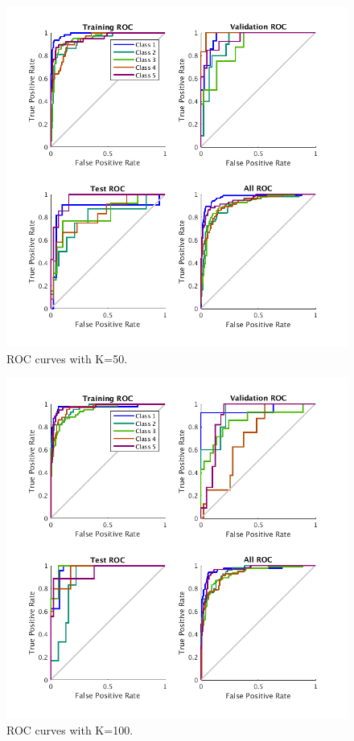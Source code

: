 \documentclass{article}
\begin{document}
\begin{figure}[h]
\centering
\includegraphics[scale=0.5]{Figures/Metrics/roc_k50}
\caption{ROC curves with K=50.}
\label{fig:r50}
\end{figure}
\begin{figure}[h]
\centering
\includegraphics[scale=0.5]{Figures/Metrics/roc_k100_n20}
\caption{ROC curves with K=100.}
\label{fig:r100}
\end{figure}
%
\end{document}
